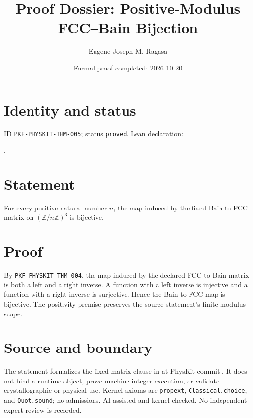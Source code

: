 \documentclass[11pt]{article}
\title{Proof Dossier: Positive-Modulus FCC--Bain Bijection}\author{Eugene Joseph M. Ragasa}\date{Formal proof completed: 2026-10-20}
\begin{document}
\maketitle
\section{Identity and status}
ID \texttt{PKF-PHYSKIT-THM-005}; status \texttt{proved}. Lean declaration:
\par{}.
\section{Statement}
For every positive natural number $n$, the map induced by the fixed Bain-to-FCC matrix on
$(\mathbb Z/n\mathbb Z)^3$ is bijective.
\section{Proof}
By \texttt{PKF-PHYSKIT-THM-004}, the map induced by the declared FCC-to-Bain matrix is both
a left and a right inverse. A function with a left inverse is injective and a function with
a right inverse is surjective. Hence the Bain-to-FCC map is bijective. The positivity
premise preserves the source statement's finite-modulus scope.
\section{Source and boundary}
The statement formalizes the fixed-matrix clause in
 at PhysKit commit
. It does not bind a runtime object,
prove machine-integer execution, or validate crystallographic or physical use. Kernel
axioms are \texttt{propext}, \texttt{Classical.choice}, and \texttt{Quot.sound}; no
admissions. AI-assisted and kernel-checked. No independent expert review is recorded.
\end{document}
